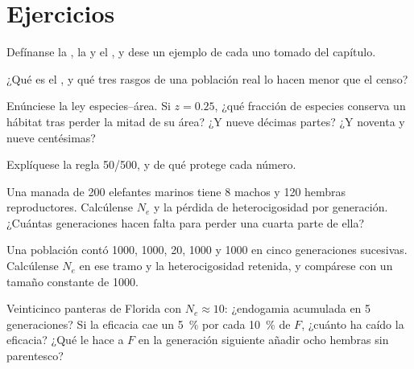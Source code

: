 \section{Ejercicios}

\begin{exercise}[$\star$]\label{exo:b3:conservation-biology:1}
Defínanse la , la  y
el , y dese un ejemplo de cada uno tomado del capítulo.
\end{exercise}

\begin{exercise}[$\star$]\label{exo:b3:conservation-biology:2}
¿Qué es el , y qué tres rasgos de una
población real lo hacen menor que el censo?
\end{exercise}

\begin{exercise}[$\star$]\label{exo:b3:conservation-biology:3}
Enúnciese la ley especies--área. Si $z = 0.25$, ¿qué fracción de
especies conserva un hábitat tras perder la mitad de su área? ¿Y nueve
décimas partes? ¿Y noventa y nueve centésimas?
\end{exercise}

\begin{exercise}[$\star$]\label{exo:b3:conservation-biology:4}
Explíquese la regla 50/500, y de qué protege cada número.
\end{exercise}

\begin{exercise}[$\star\star$]\label{exo:b3:conservation-biology:5}
Una manada de 200 elefantes marinos tiene 8 machos y 120 hembras
reproductores. Calcúlense $N_{e}$ y la pérdida de heterocigosidad por
generación. ¿Cuántas generaciones hacen falta para perder una cuarta
parte de ella?
\end{exercise}

\begin{exercise}[$\star\star$]\label{exo:b3:conservation-biology:6}
Una población contó 1000, 1000, 20, 1000 y 1000 en cinco generaciones
sucesivas. Calcúlense $N_{e}$ en ese tramo y la heterocigosidad
retenida, y compárese con un tamaño constante de 1000.
\end{exercise}

\begin{exercise}[$\star\star$]\label{exo:b3:conservation-biology:7}
Veinticinco panteras de Florida con $N_{e} \approx 10$: ¿endogamia
acumulada en 5 generaciones? Si la eficacia cae un \qty{5}{\%} por cada
\qty{10}{\%} de $F$, ¿cuánto ha caído la eficacia? ¿Qué le hace a $F$ en
la generación siguiente añadir ocho hembras sin parentesco?
\end{exercise}

